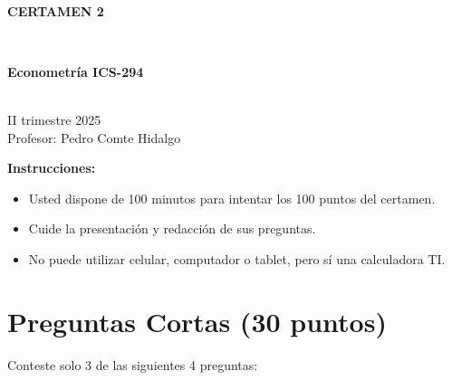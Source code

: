 \documentclass[10pt,a4paper]{article}
\begin{document}
\vspace{5cm}



\begin{center}
\begin{large}
\textbf{\\CERTAMEN 2}
\end{large}\\
\end{center}

\begin{center}
\begin{large}
\textbf{Econometría ICS-294}
\end{large}\\
\vspace{0.2cm}
II trimestre 2025\\
Profesor: Pedro Comte Hidalgo\\
\end{center}

\textbf{Instrucciones:} 

\begin{itemize}

    \item Usted dispone de 100 minutos  para intentar los 100 puntos del certamen.
    \item Cuide la presentación y redacción de sus preguntas.
    \item No puede utilizar celular, computador o tablet, pero sí una calculadora TI.
     
\end{itemize}

\section{Preguntas Cortas (30 puntos)}
Conteste solo 3 de las siguientes 4 preguntas:
\end{document}
